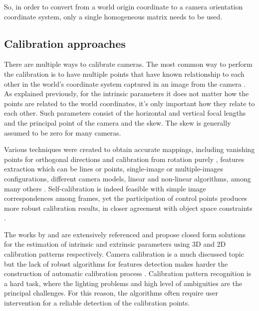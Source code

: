 \documentclass[msc, a4paper, classic, en]{ufbathesis}
\begin{document}
So, in order to convert from a world origin coordinate to a camera orientation coordinate system, only a single homogeneous matrix needs to be used.

\subsection{Calibration approaches}

There are multiple ways to calibrate cameras. The most common way to perform the calibration is to have multiple points that have known relationship to each other in the world's coordinate system captured in an image from the camera \cite{tillapaugh2008indirect}. As explained previously, for the intrinsic parameters it does not matter how the points are related to the world coordinates, it's only important how they relate to each other. Such parameters consist of the horizontal and vertical focal lengths and the principal point of the camera and the skew. The skew is generally assumed to be zero \cite{furht2011handbook} for many cameras.

Various techniques were created to obtain accurate mappings, including vanishing points for orthogonal directions and calibration from rotation purely \cite{Medioni:2004:ETC:993884}, features extraction which can be lines or points, single-image or multiple-images configurations, different camera models, linear and non-linear algorithms, among many others \cite{Armangue00acomparative} \cite{clarke98}. Self-calibration is indeed feasible with simple image correspondences among frames, yet the participation of control points produces more robust calibration results, in closer agreement with object space constraints \cite{Douskos_automaticcalibration}.

The works by \cite{Tsai86} and \cite{zhang2000flexible} are extensively referenced and propose closed form solutions for the estimation of intrinsic and extrinsic parameters using 3D and 2D calibration patterns respectively. Camera calibration is a much discussed topic but the lack of robust algorithms for features detection makes harder the construction of automatic calibration process \cite{gustavo}. Calibration pattern recognition is a hard task, where the lighting problems and high level of ambiguities are the principal challenges. For this reason, the algorithms often require user intervention for a reliable detection of the calibration points.
\end{document}
